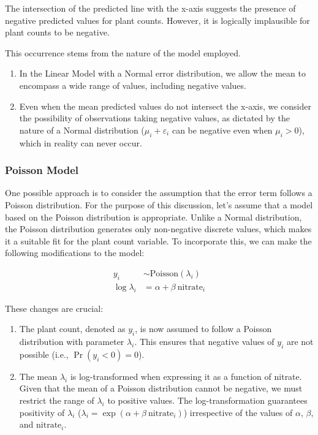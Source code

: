 \documentclass[
]{article}
\providecommand{\tightlist}{%
  \setlength{\itemsep}{0pt}\setlength{\parskip}{0pt}}
\begin{document}
The intersection of the predicted line with the x-axis suggests the presence of negative predicted values for plant counts. However, it is logically implausible for plant counts to be negative.

This occurrence stems from the nature of the model employed.

\begin{enumerate}
\def\labelenumi{\arabic{enumi}.}
\tightlist
\item
  In the Linear Model with a Normal error distribution, we allow the mean to encompass a wide range of values, including negative values.
\item
  Even when the mean predicted values do not intersect the x-axis, we consider the possibility of observations taking negative values, as dictated by the nature of a Normal distribution (\(\mu_i + \varepsilon_i\) can be negative even when \(\mu_i > 0\)), which in reality can never occur.
\end{enumerate}

\hypertarget{poisson-model}{%
\subsubsection{Poisson Model}\label{poisson-model}}

One possible approach is to consider the assumption that the error term follows a Poisson distribution. For the purpose of this discussion, let's assume that a model based on the Poisson distribution is appropriate. Unlike a Normal distribution, the Poisson distribution generates only non-negative discrete values, which makes it a suitable fit for the plant count variable. To incorporate this, we can make the following modifications to the model:

\[
\begin{aligned}
y_i &\sim \text{Poisson}(\lambda_i)\\
\log\lambda_i &= \alpha + \beta~\text{nitrate}_i
\end{aligned}
\]

These changes are crucial:

\begin{enumerate}
\def\labelenumi{\arabic{enumi}.}
\tightlist
\item
  The plant count, denoted as \(y_i\), is now assumed to follow a Poisson distribution with parameter \(\lambda_i\). This ensures that negative values of \(y_i\) are not possible (i.e., \(\Pr(y_i < 0) = 0\)).
\item
  The mean \(\lambda_i\) is log-transformed when expressing it as a function of nitrate. Given that the mean of a Poisson distribution cannot be negative, we must restrict the range of \(\lambda_i\) to positive values. The log-transformation guarantees positivity of \(\lambda_i\) (\(\lambda_i = \exp(\alpha + \beta~\text{nitrate}_i)\)) irrespective of the values of \(\alpha\), \(\beta\), and \(\text{nitrate}_i\).
\end{enumerate}
\end{document}
